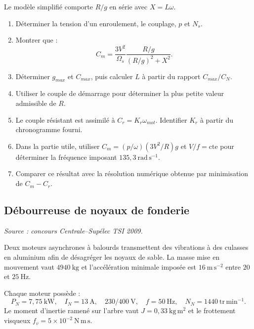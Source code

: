 Le modèle simplifié comporte $R/g$ en série avec $X=L\omega$.

\begin{enumerate}
  \item Déterminer la tension d'un enroulement, le couplage, $p$ et $N_s$.
  \item Montrer que :
  \[
  C_m=\frac{3V^2}{\Omega_s}\frac{R/g}{(R/g)^2+X^2}.
  \]
  \item Déterminer $g_{max}$ et $C_{max}$, puis calculer $L$ à partir du rapport $C_{max}/C_N$.
  \item Utiliser le couple de démarrage pour déterminer la plus petite valeur admissible de $R$.
  \item Le couple résistant est assimilé à $C_r=K_r\omega_{mot}$. Identifier $K_r$ à partir du chronogramme fourni.
  \item Dans la partie utile, utiliser $C_m=(p/\omega)(3V^2/R)g$ et $V/f=\mathrm{cte}$ pour déterminer la fréquence imposant $135{,}3\ \mathrm{rad\,s^{-1}}$.
  \item Comparer ce résultat avec la résolution numérique obtenue par minimisation de $C_m-C_r$.
\end{enumerate}


\subsection{Débourreuse de noyaux de fonderie}

\textit{Source : concours Centrale--Supélec TSI 2009.}

Deux moteurs asynchrones à balourds transmettent des vibrations à des culasses en aluminium afin de désagréger les noyaux de sable. La masse mise en mouvement vaut $4940\ \mathrm{kg}$ et l'accélération minimale imposée est $16\ \mathrm{m\,s^{-2}}$ entre $20$ et $25\ \mathrm{Hz}$.

Chaque moteur possède :
\[
P_N=7{,}75\ \mathrm{kW},\quad I_N=13\ \mathrm A,\quad 230/400\ \mathrm V,\quad
f=50\ \mathrm{Hz},\quad N_N=1440\ \mathrm{tr\,min^{-1}}.
\]
Le moment d'inertie ramené sur l'arbre vaut $J=0{,}33\ \mathrm{kg\,m^2}$ et le frottement visqueux $f_v=5\times10^{-2}\ \mathrm{N\,m\,s}$.

